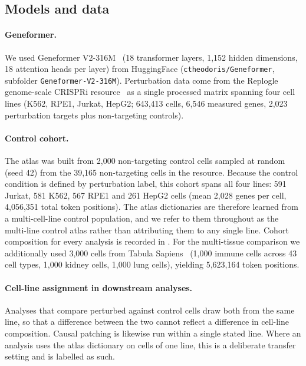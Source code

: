 \subsection*{Models and data}

\paragraph{Geneformer.} We used Geneformer V2-316M~\cite{theodoris2023transfer} (18 transformer
layers, 1,152 hidden dimensions, 18 attention heads per layer) from HuggingFace
(\texttt{ctheodoris/\allowbreak Geneformer}, subfolder \texttt{Geneformer-V2-316M}). Perturbation
data come from the Replogle genome-scale CRISPRi resource~\cite{replogle2022mapping} as a single
processed matrix spanning four cell lines (K562, RPE1, Jurkat, HepG2; 643,413 cells, 6,546 measured
genes, 2,023 perturbation targets plus non-targeting controls).

\paragraph{Control cohort.} The atlas was built from 2,000 non-targeting control cells sampled at
random (seed 42) from the 39,165 non-targeting cells in the resource. Because the control condition
is defined by perturbation label, this cohort spans all four lines: 591 Jurkat, 581 K562, 567 RPE1
and 261 HepG2 cells (mean 2,028 genes per cell, 4,056,351 total token positions). The atlas
dictionaries are therefore learned from a multi-cell-line control population, and we refer to them
throughout as the multi-line control atlas rather than attributing them to any single line. Cohort
composition for every analysis is recorded in . For the multi-tissue
comparison we additionally used 3,000 cells from Tabula Sapiens~\cite{tabula2022tabula} (1,000
immune cells across 43 cell types, 1,000 kidney cells, 1,000 lung cells), yielding 5,623,164 token
positions.

\paragraph{Cell-line assignment in downstream analyses.} Analyses that compare perturbed against
control cells draw both from the same line, so that a difference between the two cannot reflect a
difference in cell-line composition. Causal patching is likewise run within a single stated line.
Where an analysis uses the atlas dictionary on cells of one line, this is a deliberate transfer
setting and is labelled as such.

